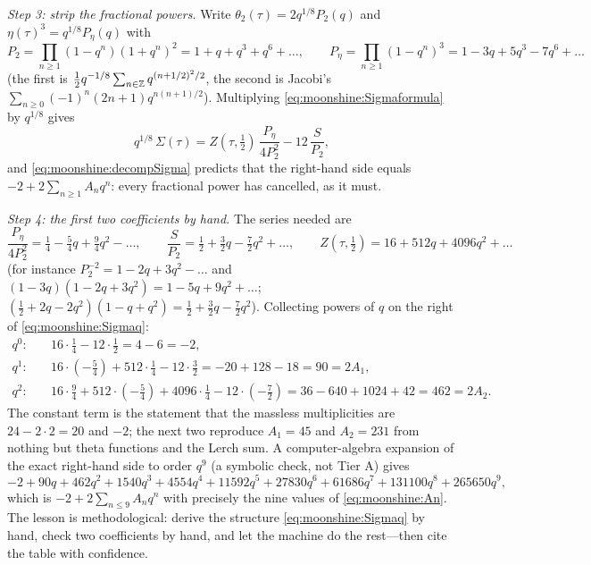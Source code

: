 \emph{Step 3: strip the fractional powers.} Write $\theta_2(\tau)=2q^{1/8}P_2(q)$ and
$\eta(\tau)^3=q^{1/8}P_\eta(q)$ with
\[
  P_2=\prod_{n\ge1}(1-q^n)(1+q^n)^2=1+q+q^3+q^6+\dots,\qquad
  P_\eta=\prod_{n\ge1}(1-q^n)^3=1-3q+5q^3-7q^6+\dots
\]
(the first is $\tfrac12q^{-1/8}\sum_{n\in\mathbb{Z}}q^{(n+1/2)^2/2}$, the second is Jacobi's
$\sum_{n\ge0}(-1)^n(2n+1)q^{n(n+1)/2}$). Multiplying \eqref{eq:moonshine:Sigmaformula} by
$q^{1/8}$ gives
\begin{equation}\label{eq:moonshine:Sigmaq}
  q^{1/8}\,\Sigma(\tau)=Z(\tau,\tfrac12)\,\frac{P_\eta}{4P_2^2}-12\,\frac{S}{P_2},
\end{equation}
and \eqref{eq:moonshine:decompSigma} predicts that the right-hand side equals
$-2+2\sum_{n\ge1}A_nq^n$: every fractional power has cancelled, as it must.

\emph{Step 4: the first two coefficients by hand.} The series needed are
\[
  \frac{P_\eta}{4P_2^2}=\tfrac14-\tfrac54q+\tfrac94q^2-\dots,\qquad
  \frac{S}{P_2}=\tfrac12+\tfrac32q-\tfrac72q^2+\dots,\qquad
  Z(\tau,\tfrac12)=16+512q+4096q^2+\dots
\]
(for instance $P_2^{-2}=1-2q+3q^2-\dots$ and $(1-3q)(1-2q+3q^2)=1-5q+9q^2+\dots$;
$(\tfrac12+2q-2q^2)(1-q+q^2)=\tfrac12+\tfrac32q-\tfrac72q^2$). Collecting powers of $q$
on the right of \eqref{eq:moonshine:Sigmaq}:
\begin{align*}
 q^0:&\quad 16\cdot\tfrac14-12\cdot\tfrac12=4-6=-2,\\
 q^1:&\quad 16\cdot(-\tfrac54)+512\cdot\tfrac14-12\cdot\tfrac32=-20+128-18=90=2A_1,\\
 q^2:&\quad 16\cdot\tfrac94+512\cdot(-\tfrac54)+4096\cdot\tfrac14-12\cdot(-\tfrac72)
   =36-640+1024+42=462=2A_2 .
\end{align*}
The constant term is the statement that the massless multiplicities are $24-2\cdot2=20$
and $-2$; the next two reproduce $A_1=45$ and $A_2=231$ from nothing but theta functions
and the Lerch sum. A computer-algebra expansion of the exact right-hand side to order
$q^9$ (a symbolic check, not Tier A) gives
\[
  -2+90q+462q^2+1540q^3+4554q^4+11592q^5+27830q^6+61686q^7+131100q^8+265650q^9,
\]
which is $-2+2\sum_{n\le9}A_nq^n$ with precisely the nine values of
\eqref{eq:moonshine:An}. The lesson is methodological: derive the structure
\eqref{eq:moonshine:Sigmaq} by hand, check two coefficients by hand, and let the machine
do the rest---then cite the table with confidence.

